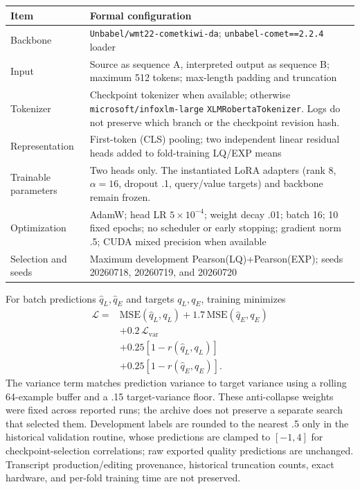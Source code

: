 \begin{center}
\begin{minipage}{\columnwidth}
\centering
\scriptsize
\setlength{\tabcolsep}{2pt}
\label{tab:model-card}
\begin{tabular}{p{}p{}}
\toprule
Item & Formal configuration \\
\midrule
Backbone & \texttt{Unbabel/wmt22-cometkiwi-da}; \texttt{unbabel-comet==2.2.4} loader \\
Input & Source as sequence A, interpreted output as sequence B; maximum 512 tokens; max-length padding and truncation \\
Tokenizer & Checkpoint tokenizer when available; otherwise \texttt{microsoft/infoxlm-large} \texttt{XLMRobertaTokenizer}. Logs do not preserve which branch or the checkpoint revision hash. \\
Representation & First-token (CLS) pooling; two independent linear residual heads added to fold-training LQ/EXP means \\
Trainable parameters & Two heads only. The instantiated LoRA adapters (rank 8, $\alpha=16$, dropout .1, query/value targets) and backbone remain frozen. \\
Optimization & AdamW; head LR $5\times10^{-4}$; weight decay .01; batch 16; 10 fixed epochs; no scheduler or early stopping; gradient norm .5; CUDA mixed precision when available \\
Selection and seeds & Maximum development Pearson(LQ)+Pearson(EXP); seeds 20260718, 20260719, and 20260720 \\
\bottomrule
\end{tabular}
\setlength{\tabcolsep}{6pt}
\end{minipage}
\end{center}

For batch predictions $\hat q_L,\hat q_E$ and targets $q_L,q_E$, training
minimizes
\begin{equation}
\begin{aligned}
\mathcal L={}&\mathrm{MSE}(\hat q_L,q_L)+1.7\,\mathrm{MSE}(\hat q_E,q_E)\\
&+0.2\,\mathcal L_{\mathrm{var}}\\
&+0.25[1-r(\hat q_L,q_L)]\\
&+0.25[1-r(\hat q_E,q_E)].
\end{aligned}
\end{equation}
The variance term matches prediction variance to target variance using a
rolling 64-example buffer and a .15 target-variance floor. These anti-collapse
weights were fixed across reported runs; the archive does not preserve a
separate search that selected them. Development labels are rounded to the
nearest .5 only in the historical validation routine, whose predictions are
clamped to $[-1,4]$ for checkpoint-selection correlations; raw exported quality
predictions are unchanged. Transcript production/editing provenance,
historical truncation counts, exact hardware, and per-fold training time are
not preserved.
